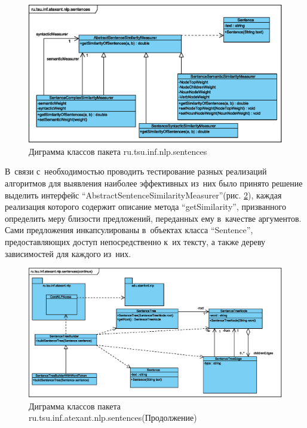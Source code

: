 \begin{figure}
\begin{center}
\includegraphics[scale=0.6]{eps/ru.tsu.inf.atexant.nlp.sentences.eps}
\caption{Диграмма классов пакета ru.tsu.inf.nlp.sentences}
\label{uml:ru.tsu.inf.atexant.nlp.sentences}
\end{center}
\end{figure}


В~связи с~необходимостью проводить тестирование разных реализаций алгоритмов
для выявления наиболее эффективных из~них было принято решение выделить интерфейс
``AbstractSentenceSimilarityMeasurer''(рис. \ref{uml:ru.tsu.inf.atexant.nlp.sentences2}), 
каждая реализация которого содержит описание метода ``getSimilarity'',
призванного определить меру близости предложений, переданных ему в~качестве аргументов.
Сами предложения инкапсулированы в~объектах класса ``Sentence'', предоставляющих доступ
непосредственно к~их тексту, а также дереву зависимостей для каждого из~них.

\begin{figure}
\begin{center}
\includegraphics[scale=0.6]{eps/ru.tsu.inf.atexant.nlp.sentences(continue).eps}
\caption{Диграмма классов пакета ru.tsu.inf.atexant.nlp.sentences(Продолжение)}
\label{uml:ru.tsu.inf.atexant.nlp.sentences2}
\end{center}
\end{figure}

